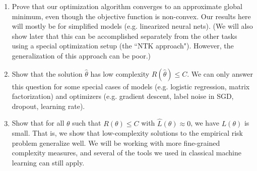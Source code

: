 \begin{enumerate}
    \item Prove that our optimization algorithm converges to an approximate global minimum, even though the objective function is non-convex. Our results here will mostly be for simplified models (e.g. linearized neural nets). (We will also show later that this can be accomplished separately from the other tasks using a special optimization setup (the ``NTK approach"). However, the generalization of this approach can be poor.)
    
    \item Show that the solution $\hat{\theta}$ has low complexity $R(\hat{\theta})\leq C$. We can only answer this question for some special cases of models (e.g. logistic regression, matrix factorization) and optimizers (e.g. gradient descent, label noise in SGD, dropout, learning rate).
    
    \item Show that for all $\theta$ such that $R(\theta)\leq C$ with $\hat{L}(\theta)\approx 0$, we have $L(\theta)$ is small. That is, we show that low-complexity solutions to the empirical risk problem generalize well. We will be working with more fine-grained complexity measures, and several of the tools we used in classical machine learning can still apply.
\end{enumerate}



